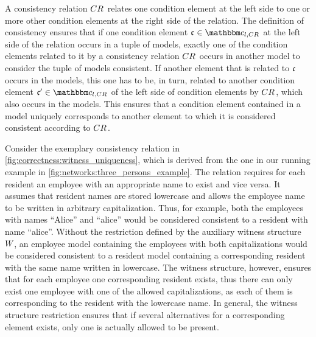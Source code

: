 A consistency relation $\consistencyrelation{CR}{}$ relates one condition element at the left side to one or more other condition elements at the right side of the relation.
The definition of consistency ensures that if one condition element $\conditionelement{c}{} \in \condition{c}{l,\consistencyrelation{CR}{}}$ at the left side of the relation occurs in a tuple of models, exactly one of the condition elements related to it by a consistency relation $\consistencyrelation{CR}{}$ occurs in another model to consider the tuple of models consistent.
If another element that is related to $\conditionelement{c}{}$ occurs in the models, this one has to be, in turn, related to another condition element $\conditionelement{c}{}' \in \condition{c}{l,\consistencyrelation{CR}{}}$ of the left side of condition elements by $\consistencyrelation{CR}{}$, which also occurs in the models.
This ensures that a condition element contained in a model uniquely corresponds to another element to which it is considered consistent according to $\consistencyrelation{CR}{}$.

Consider the exemplary consistency relation in \autoref{fig:correctness:witness_uniqueness}, which is derived from the one in our running example in \autoref{fig:networks:three_persons_example}.
The relation requires for each resident an employee with an appropriate name to exist and vice versa.
It assumes that resident names are stored lowercase and allows the employee name to be written in arbitrary capitalization.
Thus, for example, both the employees with names \enquote{Alice} and \enquote{alice} would be considered consistent to a resident with name \enquote{alice}.
Without the restriction defined by the auxiliary witness structure $\consistencyrelation{W}{}$, an employee model containing the employees with both capitalizations would be considered consistent to a resident model containing a corresponding resident with the same name written in lowercase.
The witness structure, however, ensures that for each employee one corresponding resident exists, thus there can only exist one employee with one of the allowed capitalizations, as each of them is corresponding to the resident with the lowercase name.
In general, the witness structure restriction ensures that if several alternatives for a corresponding element exists, only one is actually allowed to be present.

